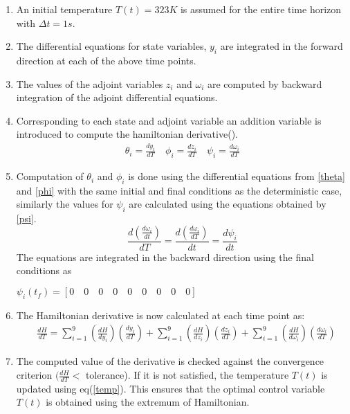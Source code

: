 \documentclass[3p,times,authoryear]{elsarticle}
\begin{document}
\begin{enumerate}
\item An initial temperature $T(t) = 323 K$ is assumed for the entire time horizon with $\Delta t = 1s$.
\item The differential equations for state variables, $y_{i}$ are integrated in the forward direction at each of the above time points.
\item The values of the adjoint variables $z_{i}$ and $\omega_{i}$ are computed by backward integration of the adjoint differential equations. 
\item Corresponding to each state and adjoint variable an addition variable is introduced to compute the hamiltonian derivative(\cite{benavides}).
\begin{align}
\theta_{i} = \frac{dy_{i}}{dT} \quad \phi_{i} = \frac{dz_{i}}{dT} \quad \psi_{i} = \frac{d\omega_{i}}{dT} \label{thetafipsi} 
\end{align}
\item Computation of $\theta_{i}$ and $\phi_{i}$ is done using the differential equations from \ref{theta} and \ref{phi} with the same initial and final conditions as the deterministic case, similarly the values for $\psi_{i}$ are calculated using the equations obtained by \ref{psi}.
\begin{equation}
\frac{d\left( \frac{d\omega_{i}}{dt}  \right)}{dT} = \frac{d\left( \frac{d\omega_{i}}{dT}  \right)}{dt} = \frac{d\psi_{i}}{dt} \label{psi} 
\end{equation}
The equations are integrated in the backward direction using the final conditions as 
\begin{center}
 $\psi_{i}(t_{f}) = \left[  0 \quad 0 \quad 0 \quad 0 \quad 0 \quad 0 \quad 0 \quad 0 \quad 0 \right]$ 
\end{center} 
\item The Hamiltonian derivative is now calculated at each time point as:
\begin{align}
&\frac{dH}{dT} = \sum_{i=1}^{9} \left( \frac{dH}{dy_{i}}\right)\left(	\frac{dy_{i}}{dT} \right) + \sum_{i=1}^{9} \left(\frac{dH}{dz_{i}}\right)\left(\frac{dz_{i}}{dT} \right) + \sum_{i=1}^{9} \left(\frac{dH}{d\omega_{i}}\right)\left(\frac{d\omega_{i}}{dT} \right)
\end{align}
\item The computed value of the derivative is checked against the convergence criterion $(\frac{dH}{dT}<$ tolerance). If it is not satisfied, the temperature $T(t)$ is updated using eq(\ref{temp}). This ensures that the optimal control variable $T(t)$ is obtained using the extremum of Hamiltonian. 

\end{enumerate}
\end{document}
